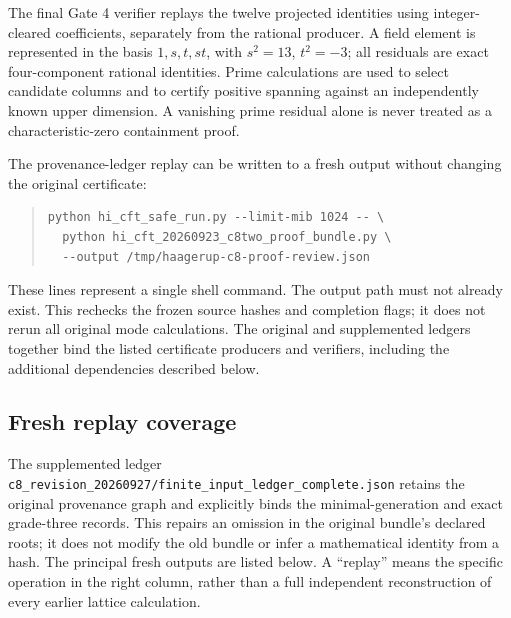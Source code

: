 \documentclass[11pt,a4paper]{article}
\theoremstyle{definition}
\newcommand{\artifact}[1]{\textnormal{\nolinkurl{#1}}}
\begin{document}
The final Gate 4 verifier replays the twelve projected identities using
integer-cleared coefficients, separately from the rational producer.
A field element is represented in the basis
\(1,s,t,st\), with \(s^2=13\), \(t^2=-3\); all residuals are
exact four-component rational identities. Prime calculations are used
to select candidate columns and to certify positive spanning against
an independently known upper dimension. A vanishing prime residual
alone is never treated as a characteristic-zero containment proof.

The provenance-ledger replay can be written to a fresh output without
changing the original certificate:
\begin{quote}\small
\begin{verbatim}
python hi_cft_safe_run.py --limit-mib 1024 -- \
  python hi_cft_20260923_c8two_proof_bundle.py \
  --output /tmp/haagerup-c8-proof-review.json
\end{verbatim}
\end{quote}
These lines represent a single shell command. The output path must not
already exist. This rechecks the frozen source hashes and completion
flags; it does not rerun all original mode calculations. The original
and supplemented ledgers together bind the listed certificate
producers and verifiers, including the additional dependencies
described below.

\subsection{Fresh replay coverage}
The supplemented ledger
\artifact{c8_revision_20260927/finite_input_ledger_complete.json}
retains the original provenance graph and explicitly binds the
minimal-generation and exact grade-three records. This repairs an
omission in the original bundle's declared roots; it does not modify
the old bundle or infer a mathematical identity from a hash.
The principal fresh outputs are listed below. A ``replay'' means the
specific operation in the right column, rather than a full independent
reconstruction of every earlier lattice calculation.
\end{document}
